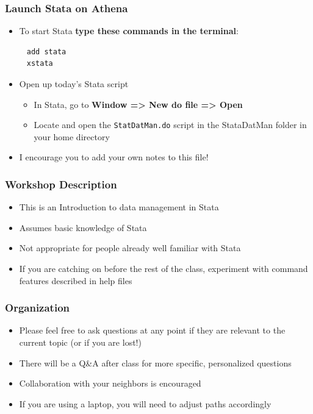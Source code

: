 \documentclass[table]{beamer}
\begin{document}
\begin{frame}[fragile]
\frametitle{Launch Stata on Athena}
\label{sec-1-2}


\begin{itemize}
\item To start Stata \textbf{type these commands in the terminal}:
\end{itemize}
\begin{verbatim}
     add stata
     xstata
\end{verbatim}
\begin{itemize}
\item Open up today's Stata script
\begin{itemize}
\item In Stata, go to \textbf{Window => New do file => Open}
\item Locate and open the \texttt{StatDatMan.do} script in the StataDatMan folder in your home directory
\end{itemize}
\item I encourage you to add your own notes to this file!
\end{itemize}
\end{frame}
\begin{frame}
\frametitle{Workshop Description}
\label{sec-1-3}

\begin{itemize}
\item This is an Introduction to data management in Stata
\item Assumes basic knowledge of Stata
\item Not appropriate for people already well familiar with Stata
\item If you are catching on before the rest of the class, experiment with command features described in help files
\end{itemize}
\end{frame}
\begin{frame}
\frametitle{Organization}
\label{sec-1-4}

\begin{itemize}
\item Please feel free to ask questions at any point if they are relevant to the current topic (or if you are lost!)
\item There will be a Q\&A after class for more specific, personalized questions
\item Collaboration with your neighbors is encouraged
\item If you are using a laptop, you will need to adjust paths accordingly
\end{itemize}
\end{frame}
\end{document}
